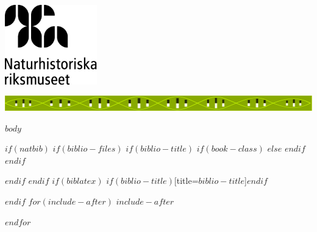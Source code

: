 \documentclass[]{article}
\begin{document}
\pagestyle{fancyplain}
\begin{titlepage}
    \raggedright{
    \includegraphics[width=4cm]{naturhistoriska-riksmuseet.png}}
    \vspace*{\fill}
    \vspace*{\fill}
    \vspace*{\fill}
    \centerline{\includegraphics[width=1.25\linewidth]{CGIbanner.pdf}}
    \vspace*{\fill}
\end{titlepage}

$body$

$if(natbib)$
$if(biblio-files)$
$if(biblio-title)$
$if(book-class)$
\renewcommand\bibname{$biblio-title$}
$else$
\renewcommand\refname{$biblio-title$}
$endif$
$endif$


$endif$
$endif$
$if(biblatex)$
\printbibliography$if(biblio-title)$[title=$biblio-title$]$endif$

$endif$
$for(include-after)$
$include-after$

$endfor$
\end{document}
